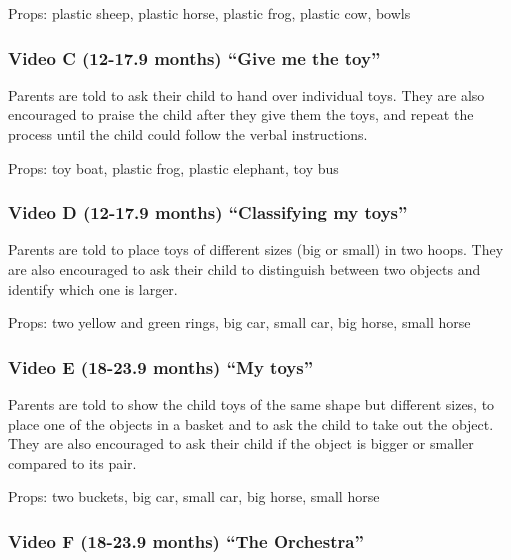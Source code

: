 \documentclass[man,floatsintext]{apa6}
\begin{document}
\begin{appendix}
Props: plastic sheep, plastic horse, plastic frog, plastic cow, bowls

\hypertarget{video-c-12-17.9-months-give-me-the-toy}{%
\subsubsection{Video C (12-17.9 months) ``Give me the
toy''}\label{video-c-12-17.9-months-give-me-the-toy}}

Parents are told to ask their child to hand over individual toys. They
are also encouraged to praise the child after they give them the toys,
and repeat the process until the child could follow the verbal
instructions.

Props: toy boat, plastic frog, plastic elephant, toy bus

\hypertarget{video-d-12-17.9-months-classifying-my-toys}{%
\subsubsection{Video D (12-17.9 months) ``Classifying my
toys''}\label{video-d-12-17.9-months-classifying-my-toys}}

Parents are told to place toys of different sizes (big or small) in two
hoops. They are also encouraged to ask their child to distinguish
between two objects and identify which one is larger.

Props: two yellow and green rings, big car, small car, big horse, small
horse

\hypertarget{video-e-18-23.9-months-my-toys}{%
\subsubsection{Video E (18-23.9 months) ``My
toys''}\label{video-e-18-23.9-months-my-toys}}

Parents are told to show the child toys of the same shape but different
sizes, to place one of the objects in a basket and to ask the child to
take out the object. They are also encouraged to ask their child if the
object is bigger or smaller compared to its pair.

Props: two buckets, big car, small car, big horse, small horse

\hypertarget{video-f-18-23.9-months-the-orchestra}{%
\subsubsection{Video F (18-23.9 months) ``The
Orchestra''}\label{video-f-18-23.9-months-the-orchestra}}


\end{appendix}
\end{document}
